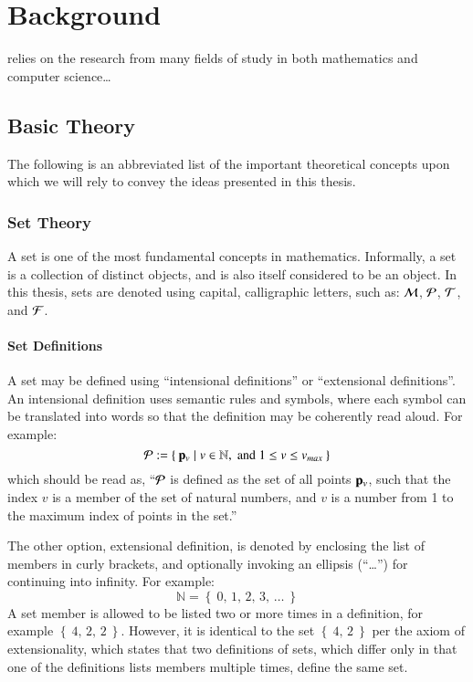 \chapter{Background}
\label{ch2}
 relies on the research from many fields of study in both mathematics and computer science\ldots
{}
%
%
%
%
%
\section{Basic Theory}
The following is an abbreviated list of the important theoretical concepts upon which we will rely to convey the ideas presented in this thesis.
%
\subsection{Set Theory}
A set is one of the most fundamental concepts in mathematics. Informally, a set is a collection of distinct objects, and is also itself considered to be an object. In this thesis, sets are denoted using capital, calligraphic letters, such as: $\mathcal{M}$, $\mathcal{P}$, $\mathcal{T}$, and $\mathcal{F}$. 
%
\subsubsection{Set Definitions}
A set may be defined using ``intensional definitions'' or ``extensional definitions''. An intensional definition uses semantic rules and symbols, where each symbol can be translated into words so that the definition may be coherently read aloud. For example:
\begin{equation}
	\mathcal{P} := \left \{\:\mathbf{p}_v \mid v \in \mathbb{N}, \;\text{and}\; 1\leq v \leq v_{max}\:\right \}
\end{equation}
which should be read as, ``$\mathcal{P}$ is defined as the set of all points $\mathbf{p}_v$, such that the index $v$ is a member of the set of natural numbers, and $v$ is a number from 1 to the maximum index of points in the set.''

The other option, extensional definition, is denoted by enclosing the list of members in curly brackets, and optionally invoking an ellipsis (``\dots'') for continuing into infinity. For example:
%
\begin{equation}
	\mathbb{N} = \left \{\:0,\,1,\,2,\,3,\,\ldots\:\right \}
\end{equation}
%
A set member is allowed to be listed two or more times in a definition, for example $\left \{\:4,\,2,\,2\:\right \}$. However, it is identical to the set $\left \{\:4,\,2\:\right \}$ per the axiom of extensionality, which states that two definitions of sets, which differ only in that one of the definitions lists members multiple times, define the same set.
%
